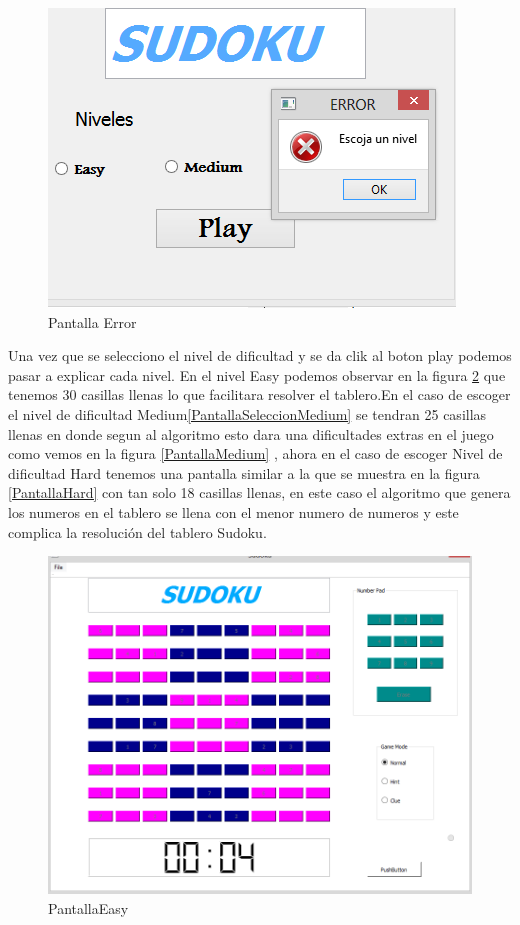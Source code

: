 \documentclass[12pt,oneside]{book}
\begin{document}
\begin{figure}[htbp]
\begin{center}
\includegraphics[width=.60\textwidth]{./imagenes/error.png}
\caption{Pantalla Error}
\label{Pantalla Error}
\end{center}
\end{figure}

Una vez que se selecciono el nivel de dificultad y se da clik al boton play podemos pasar a  explicar cada nivel. En el nivel Easy podemos observar en la figura   \ref{PantallaEasy} que tenemos 30 casillas llenas lo que facilitara resolver el tablero.En el caso de escoger el nivel de dificultad Medium\ref{PantallaSeleccionMedium} se tendran 25 casillas llenas en donde segun al algoritmo esto dara una dificultades extras en el juego como vemos en la figura \ref{PantallaMedium}  , ahora en el caso de escoger Nivel de dificultad  Hard tenemos una pantalla similar a la que se muestra en la figura \ref{PantallaHard} con tan solo 18 casillas llenas, en este caso el algoritmo que genera los numeros en el tablero se llena con el menor numero de numeros y este complica la resolución del tablero Sudoku.

\begin{figure}[htbp]
\begin{center}
\includegraphics[width=.60\textwidth]{./imagenes/PantallaEasy.png}
\caption{PantallaEasy}
\label{PantallaEasy}
\end{center}
\end{figure}
\end{document}

